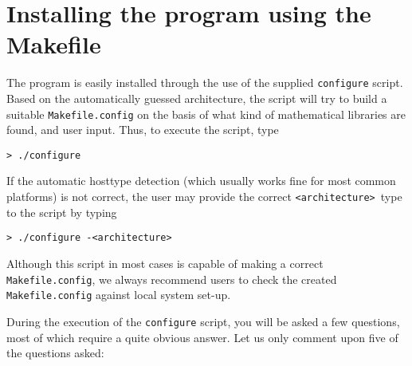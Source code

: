 \section{Installing the program using the
Makefile}\label{sec:Makefile}

The program is easily installed through the use of the supplied
\verb|configure| script. Based on the
automatically guessed architecture, the
script will try to build a suitable
\verb|Makefile.config| on the
basis of what kind of mathematical libraries are found, and user
input. Thus, to execute the script, type
\begin{verbatim}
> ./configure
\end{verbatim}

\bigskip

If the automatic hosttype detection (which usually works fine for most common
platforms) is not correct, the user may provide the correct \verb|<architecture>|\ type 
to the script by typing
\begin{verbatim}
> ./configure -<architecture>
\end{verbatim}

\bigskip

Although this script in most cases is capable of making a correct
\verb|Makefile.config|, we always recommend users to check the created
\verb|Makefile.config| against local system set-up. 

During the execution of the \verb|configure| script, you will be
asked a few questions, most of which require a quite obvious
answer. Let us only comment upon five of the questions asked:

